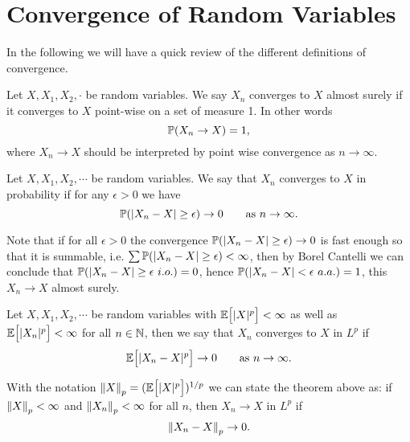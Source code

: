 \section{Convergence of Random Variables}
In the following we will have a quick review of the different definitions of convergence.

\begin{definition}
	Let $ X,X_1,X_2,\cdot $ be random variables. We say $ X_n $ converges to $ X $ almost surely if it converges to $ X $ point-wise on a set of measure 1. In other words
	\[ \mathbb{P}(X_n \to X) = 1, \]
	where $ X_n\to X$ should be interpreted by point wise convergence as $ n\to \infty $.
\end{definition}

\begin{definition}
	Let $ X,X_1,X_2,\cdots $ be random variables. We say that $ X_n $ converges to $ X $ in probability if for any $ \epsilon>0 $ we have
	\[ \mathbb{P}(|X_n - X| \geq \epsilon) \to 0 \qquad \text{as $ n\to \infty $}. \]
\end{definition}
\begin{remark}
	Note that if for all $ \epsilon>0 $ the convergence $ \mathbb{P}(|X_n - X|\geq\epsilon) \to 0 $ is fast enough so that it is summable, i.e. $ \sum\mathbb{P}(|X_n-X|\geq\epsilon)<\infty $, then by Borel Cantelli we can conclude that $ \mathbb{P}(|X_n-X|\geq\epsilon\ i.o.) = 0 $, hence $ \mathbb{P}(|X_n-X|<\epsilon\ a.a.) = 1 $, this $ X_n\to X $ almost surely.
\end{remark}

\begin{definition}[Convergence in $ L^p $]
	Let $ X,X_1,X_2,\cdots $ be random variables with $ \mathbb{E}\big[|X|^p\big] < \infty$ as well as $ \mathbb{E}\big[|X_n|^p\big] < \infty $ for all $ n \in \mathbb{N} $, then we say that $ X_n $ converges to $ X $ in $ L^p $ if 
	\[ \mathbb{E}\big[|X_n - X|^p\big] \to 0\qquad \text{as $ n\to\infty $}. \]
\end{definition}
\begin{remark}
	With the notation $ \norm{X}_p = (\mathbb{E}\big[|X|^p\big])^{1/p} $ we can state the theorem above as: if $ \norm{X}_p < \infty $ and $ \norm{X_n}_p <\infty $ for all $ n $, then $ X_n \to X $ in $ L^p $ if 
	\[ \norm{X_n - X}_p \to 0. \]
\end{remark}